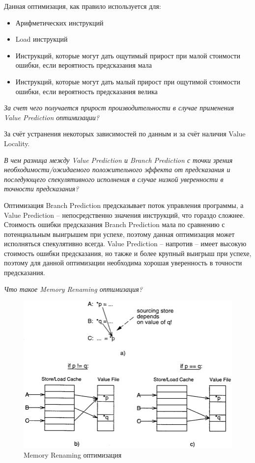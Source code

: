 	Данная оптимизация, как правило используется для:
	\begin{itemize}
		\item Арифметических инструкций
		\item Load инструкций
		\item Инструкций, которые могут дать ощутимый прирост при малой стоимости ошибки, если вероятность предсказания мала
		\item Инструкций, которые могут дать малый прирост при ощутимой стоимости ошибки, если вероятность предсказания велика
	\end{itemize}
	
	\textit{За счет чего получается прирост производительности в случае применения Value Prediction оптимизации?}
	
	За счёт устранения некоторых зависимостей по данным и за счёт наличия Value Locality.
	
	\textit{В чем разница между Value Prediction и Branch Prediction с точки зрения необходимости/ожидаемого положительного эффекта от предсказания и последующего спекулятивного исполнения в случае низкой уверенности в точности предсказания?}

	Оптимизация Branch Prediction предсказывает поток управления программы, а Value Prediction -- непосредственно значения инструкций, что гораздо сложнее. Стоимость ошибки предсказания Branch Prediction мала по сравнению с потенциальным выигрышем при успехе, поэтому данная оптимизация может исполняться спекулятивно всегда. Value Prediction -- напротив -- имеет высокую стоимость ошибки предсказания, но также и более крупный выигрыш при успехе, поэтому для данной оптимизации необходима хорошая уверенность в точности предсказания.
	
	\textit{Что такое Memory Renaming оптимизация?}
	
	\begin{figure}[h!]
		\centering
		\includegraphics[width=\linewidth]{pictures/memory-renaming.png}
		\caption{Memory Renaming оптимизация}
	\end{figure}


